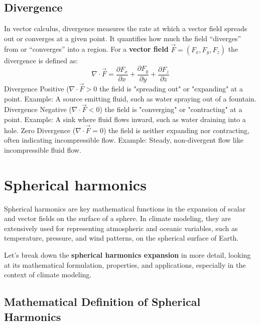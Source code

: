 \subsection{Divergence}\label{subsec:divergence}
In vector calculus, divergence measures the rate at which a vector field spreads out or converges at a given point.
It quantifies how much the field ``diverges'' from or ``converges'' into a region.
For a \textbf{vector field} $\vec{F}=(F_x,F_y,F_z)$ the divergence is defined as:
\[\nabla\cdot \vec{F}=\frac{\partial F_x}{\partial x}+\frac{\partial F_y}{\partial y}+\frac{\partial F_z}{\partial z}\]
Divergence Positive ($\nabla\cdot \vec{F}>0$ the field is "spreading out" or "expanding" at a point.
Example: A source emitting fluid, such as water spraying out of a fountain.
Divergence Negative ($\nabla\cdot \vec{F}<0$) the field is "converging" or "contracting" at a point.
Example: A sink where fluid flows inward, such as water draining into a hole.
Zero Divergence ($\nabla\cdot \vec{F}=0$) the field is neither expanding nor contracting, often indicating incompressible flow.
Example: Steady, non-divergent flow like incompressible fluid flow.

\section{Spherical harmonics}
\label{sec:spherical-harmonics}

Spherical harmonics are key mathematical functions in the expansion of scalar and vector fields on the surface of a sphere. In climate modeling, they are extensively used for representing atmospheric and oceanic variables, such as temperature, pressure, and wind patterns, on the spherical surface of Earth.

Let's break down the \textbf{spherical harmonics expansion} in more detail, looking at its mathematical formulation, properties, and applications, especially in the context of climate modeling.

\subsection{Mathematical Definition of Spherical Harmonics}
\label{subsec:spherical-harmonics-def}


